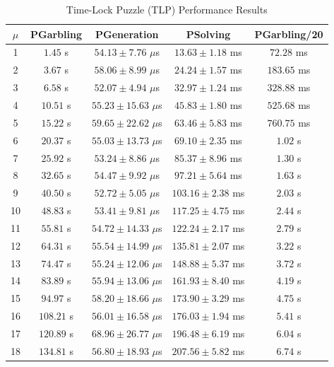 
\begin{table}[htbp]
\centering
\caption{Time-Lock Puzzle (TLP) Performance Results}
\label{tab:tlp_results}
\begin{tabular}{|c|c|c|c|c|}
\hline
\textbf{$\mu$} & \textbf{PGarbling} & \textbf{PGeneration} & \textbf{PSolving} & \textbf{PGarbling/20} \\
\hline
1 & $1.45$ s & $54.13 \pm 7.76$ $\mu$s & $13.63 \pm 1.18$ ms & $72.28$ ms \\
2 & $3.67$ s & $58.06 \pm 8.99$ $\mu$s & $24.24 \pm 1.57$ ms & $183.65$ ms \\
3 & $6.58$ s & $52.07 \pm 4.94$ $\mu$s & $32.97 \pm 1.24$ ms & $328.88$ ms \\
4 & $10.51$ s & $55.23 \pm 15.63$ $\mu$s & $45.83 \pm 1.80$ ms & $525.68$ ms \\
5 & $15.22$ s & $59.65 \pm 22.62$ $\mu$s & $63.46 \pm 5.83$ ms & $760.75$ ms \\
6 & $20.37$ s & $55.03 \pm 13.73$ $\mu$s & $69.10 \pm 2.35$ ms & $1.02$ s \\
7 & $25.92$ s & $53.24 \pm 8.86$ $\mu$s & $85.37 \pm 8.96$ ms & $1.30$ s \\
8 & $32.65$ s & $54.47 \pm 9.92$ $\mu$s & $97.21 \pm 5.64$ ms & $1.63$ s \\
9 & $40.50$ s & $52.72 \pm 5.05$ $\mu$s & $103.16 \pm 2.38$ ms & $2.03$ s \\
10 & $48.83$ s & $53.41 \pm 9.81$ $\mu$s & $117.25 \pm 4.75$ ms & $2.44$ s \\
11 & $55.81$ s & $54.72 \pm 14.33$ $\mu$s & $122.24 \pm 2.17$ ms & $2.79$ s \\
12 & $64.31$ s & $55.54 \pm 14.99$ $\mu$s & $135.81 \pm 2.07$ ms & $3.22$ s \\
13 & $74.47$ s & $55.24 \pm 12.06$ $\mu$s & $148.88 \pm 5.37$ ms & $3.72$ s \\
14 & $83.89$ s & $55.94 \pm 13.06$ $\mu$s & $161.93 \pm 8.40$ ms & $4.19$ s \\
15 & $94.97$ s & $58.20 \pm 18.66$ $\mu$s & $173.90 \pm 3.29$ ms & $4.75$ s \\
16 & $108.21$ s & $56.01 \pm 16.58$ $\mu$s & $176.03 \pm 1.94$ ms & $5.41$ s \\
17 & $120.89$ s & $68.96 \pm 26.77$ $\mu$s & $196.48 \pm 6.19$ ms & $6.04$ s \\
18 & $134.81$ s & $56.80 \pm 18.93$ $\mu$s & $207.56 \pm 5.82$ ms & $6.74$ s \\

\end{tabular}
\end{table}
